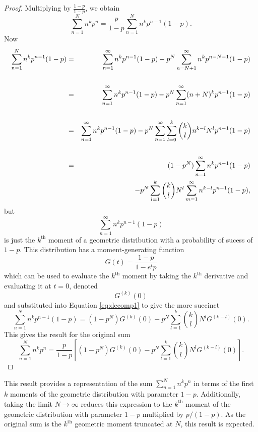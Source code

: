 \documentclass[letterpaper,12pt,oneside,final]{article}
\begin{document}
\begin{proof}
Multiplying by $\frac{1 - p}{1 - p}$, we obtain
$$\sum_{n = 1}^{N} n^k p^n = \frac{p}{1 - p} \sum_{n = 1}^{N} n^k p^{n-1} (1 - p).$$
Now
\begin{eqnarray}
    \sum_{n = 1}^{N} n^k p^{n-1} (1 - p) & = & \sum_{n = 1}^{\infty} n^k p^{n-1} (1 - p) - p^{N} \sum_{n = N + 1}^{\infty} n^k p^{n - N - 1} (1 - p) \nonumber \\
    & & \nonumber \\
    & = & \sum_{n = 1}^{\infty} n^k p^{n-1} (1 - p) - p^{N} \sum_{n = 1}^{\infty} (n + N)^k p^{n - 1} (1 - p) \nonumber \\
    & & \nonumber \\
    & = & \sum_{n = 1}^{\infty} n^k p^{n-1} (1 - p) - p^{N} \sum_{n = 1}^{\infty} \sum_{l = 0}^k {k \choose l} n^{k-l} N^l p^{n - 1} (1 - p) \nonumber \\
    & & \nonumber \\
    & = & (1 - p^N) \sum_{n = 1}^{\infty} n^k p^{n-1} (1 - p) \nonumber \\
    & & \hspace{0.5cm}- p^{N} \sum_{l = 1}^k {k \choose l} N^l \sum_{m = 1}^{\infty}  n^{k-l} p^{n - 1} (1 - p),  \label{eq:decomp1}
\end{eqnarray}
but
$$\sum_{n = 1}^{\infty} n^k p^{n-1} (1 - p)$$
is just the $k^{\text{th}}$ moment of a geometric distribution with a probability of sucess of $1 - p$. This distribution has a moment-generating function
\begin{equation} \label{eq:geoMGF}
G(t) = \frac{1 - p}{1 - e^t p}
\end{equation}
which can be used to evaluate the $k^{\text{th}}$ moment by taking the $k^{\text{th}}$ derivative and evaluating it at $t = 0$, denoted
\begin{equation*} 
G^{(k)}(0)
\end{equation*}
and substituted into Equation \ref{eq:decomp1} to give the more succinct
\begin{equation} \label{eq:sumByMoments}
  \sum_{n = 1}^{N} n^k p^{n-1} (1 - p) = (1 - p^N) G^{(k)}(0) - p^{N} \sum_{l = 1}^k {k \choose l} N^l G^{(k-l)}(0).
\end{equation}
This gives the result for the original sum
\begin{equation} \label{eq:kfirstmoments}
 \sum_{n = 1}^{N} n^k p^n = \frac{p}{1 - p} \left [ (1 - p^N) G^{(k)}(0) - p^{N} \sum_{l = 1}^k {k \choose l} N^l G^{(k-l)}(0) \right ].
\end{equation}
\end{proof}
This result provides a representation of the sum $\sum_{n = 1}^{N} n^k p^n$ in terms of the first $k$ moments of the geometric distribution with parameter $1 - p$. Additionally, taking the limit $N \rightarrow \infty$ reduces this expression to the $k^{\text{th}}$ moment of the geometric distribution with parameter $1 - p$ multiplied by $p/(1 - p)$. As the original sum is the $k^{\text{th}}$ geometric moment truncated at $N$, this result is expected.
\end{document}
